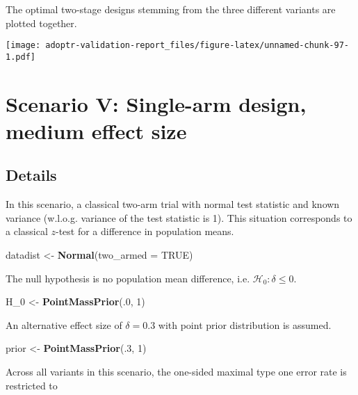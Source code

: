 \documentclass[]{book}
\newenvironment{Shaded}{\begin{snugshade}}{\end{snugshade}}
\newcommand{\DataTypeTok}[1]{\textcolor[rgb]{0.13,0.29,0.53}{#1}}
\newcommand{\DecValTok}[1]{\textcolor[rgb]{0.00,0.00,0.81}{#1}}
\newcommand{\KeywordTok}[1]{\textcolor[rgb]{0.13,0.29,0.53}{\textbf{#1}}}
\newcommand{\NormalTok}[1]{#1}
\newcommand{\OtherTok}[1]{\textcolor[rgb]{0.56,0.35,0.01}{#1}}
\newcommand{\StringTok}[1]{\textcolor[rgb]{0.31,0.60,0.02}{#1}}
\begin{document}
The optimal two-stage designs stemming from the three different variants
are plotted together.

\texttt{[image: adoptr-validation-report\_files/figure-latex/unnamed-chunk-97-1.pdf]}

\hypertarget{scenarioV}{%
\chapter{Scenario V: Single-arm design, medium effect size}\label{scenarioV}}

\hypertarget{details-4}{%
\section{Details}\label{details-4}}

In this scenario, a classical two-arm trial with normal
test statistic and known variance (w.l.o.g. variance of
the test statistic is 1).
This situation corresponds to a classical \(z\)-test for
a difference in population means.

\begin{Shaded}
\begin{Highlighting}[]
\NormalTok{datadist <-}\StringTok{ }\KeywordTok{Normal}\NormalTok{(}\DataTypeTok{two_armed =} \OtherTok{TRUE}\NormalTok{)}
\end{Highlighting}
\end{Shaded}

The null hypothesis is no population mean difference, i.e.
\(\mathcal{H}_0:\delta \leq 0\).

\begin{Shaded}
\begin{Highlighting}[]
\NormalTok{H_}\DecValTok{0}\NormalTok{ <-}\StringTok{ }\KeywordTok{PointMassPrior}\NormalTok{(.}\DecValTok{0}\NormalTok{, }\DecValTok{1}\NormalTok{)}
\end{Highlighting}
\end{Shaded}

An alternative effect size of \(\delta = 0.3\) with
point prior distribution is assumed.

\begin{Shaded}
\begin{Highlighting}[]
\NormalTok{prior <-}\StringTok{ }\KeywordTok{PointMassPrior}\NormalTok{(.}\DecValTok{3}\NormalTok{, }\DecValTok{1}\NormalTok{)}
\end{Highlighting}
\end{Shaded}

Across all variants in this scenario, the one-sided maximal
type one error rate is restricted to
\end{document}
